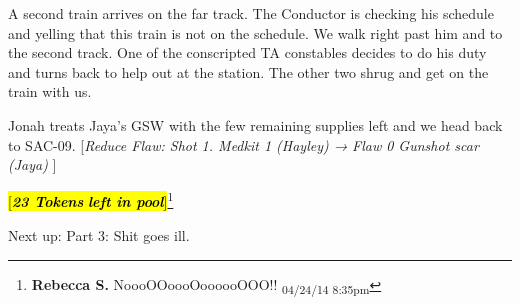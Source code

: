 A second train arrives on the far track.  The Conductor is checking his schedule and yelling that this train is not on the schedule. We walk right past him and to the second track.  One of the conscripted TA constables decides to do his duty and turns back to help out at the station.  The other two shrug and get on the train with us.



Jonah treats Jaya's GSW with the few remaining supplies left and we head back to SAC-09.  {[}\textit{Reduce Flaw: Shot 1.  Medkit 1 (Hayley) →  }\textit{ {\color[RGB]{255,0,0}Flaw 0 Gunshot scar (Jaya)} }{]}



\hl{{[}\textit{\textbf{23 Tokens}}\textit{\textbf{ left in pool}}{]}}\footnote{\textbf{Rebecca S. }NoooOOoooOoooooOOO!! \textsubscript{04/24/14 8:35pm}}



Next up: Part 3: Shit goes ill.








